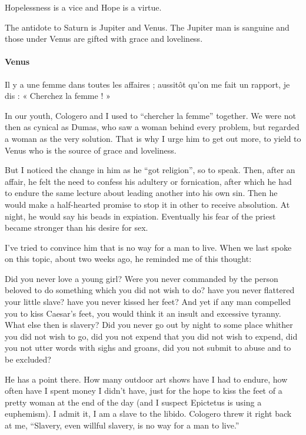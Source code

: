 Hopelessness is a vice and Hope is a virtue.

The antidote to Saturn is Jupiter and Venus. The Jupiter man is sanguine and those under Venus are gifted with grace and loveliness.

\paragraph{Venus}

\begin{quotex}
Il y a une femme dans toutes les affaires ; aussitôt qu'on me fait un rapport, je dis : « Cherchez la femme ! » 
\end{quotex}

In our youth, Cologero and I used to ``chercher la femme'' together. We were not then as cynical as Dumas, who saw a woman behind every problem, but regarded a woman as the very solution. That is why I urge him to get out more, to yield to Venus who is the source of grace and loveliness.

But I noticed the change in him as he ``got religion'', so to speak. Then, after an affair, he felt the need to confess his adultery or fornication, after which he had to endure the same lecture about leading another into his own sin. Then he would make a half-hearted promise to stop it in other to receive absolution. At night, he would say his beads in expiation. Eventually his fear of the priest became stronger than his desire for sex.

I've tried to convince him that is no way for a man to live. When we last spoke on this topic, about two weeks ago, he reminded me of this thought:

\begin{quotex}
Did you never love a young girl? Were you never commanded by the person beloved to do something which you did not wish to do? have you never flattered your little slave? have you never kissed her feet? And yet if any man compelled you to kiss Caesar's feet, you would think it an insult and excessive tyranny. What else then is slavery? Did you never go out by night to some place whither you did not wish to go, did you not expend that you did not wish to expend, did you not utter words with sighs and groans, did you not submit to abuse and to be excluded?
\end{quotex}


He has a point there. How many outdoor art shows have I had to endure, how often have I spent money I didn't have, just for the hope to kiss the feet of a pretty woman at the end of the day (and I suspect Epictetus is using a euphemism). I admit it, I am a slave to the libido. Cologero threw it right back at me, ``Slavery, even willful slavery, is no way for a man to live.''

